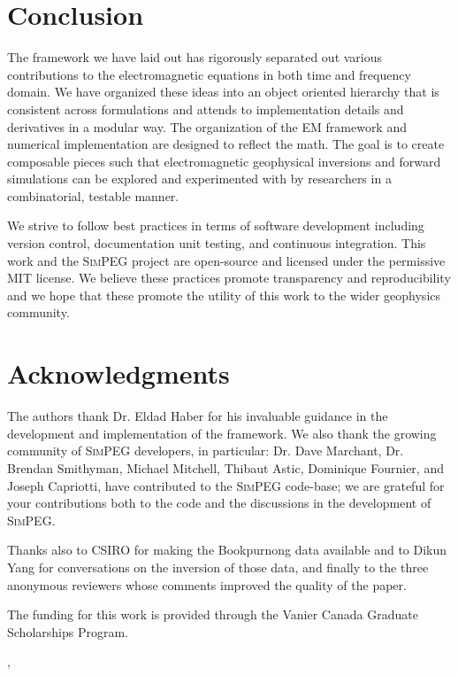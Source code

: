 \documentclass[preprint,review,3p,times,onecolumn,authoryear]{elsarticle}
\newcommand{\SimPEG}{\textsc{SimPEG}\xspace}
\begin{document}
\section{Conclusion}
\label{sec:Conclusion}

The framework we have laid out has rigorously separated out various
contributions to the electromagnetic equations in both time and frequency domain.
We have organized these ideas into an object oriented hierarchy
that is consistent across formulations and attends to
implementation details and derivatives in a modular way.
The organization of the EM framework and numerical implementation are designed to reflect the math.
The goal is to create composable pieces such that electromagnetic
geophysical inversions and forward simulations can be explored and experimented
with by researchers in a combinatorial, testable manner.

We strive to follow best practices in terms of software development including
version control, documentation unit testing, and continuous integration. This work
and the \SimPEG project are open-source and licensed under the permissive MIT
license. We believe these practices promote transparency and reproducibility and we hope
that these promote the utility of this work to the wider geophysics community.

{%
\section*{Acknowledgments}

The authors thank Dr. Eldad Haber for his invaluable guidance
in the development and implementation of the framework.
We also thank the  growing community of \SimPEG developers, in particular:
Dr. Dave Marchant, Dr. Brendan Smithyman, Michael Mitchell,
Thibaut Astic, Dominique Fournier, and Joseph Capriotti,
have contributed to the \SimPEG code-base; we are grateful for your
contributions both to the code and the discussions in the development of \SimPEG.

Thanks also to CSIRO for making the Bookpurnong data available and to Dikun
Yang for conversations on the inversion of those data, and finally to the
three anonymous reviewers whose comments improved the quality of the paper.

The funding for this work is provided through the Vanier Canada Graduate
Scholarships Program.

}



,
\end{document}
